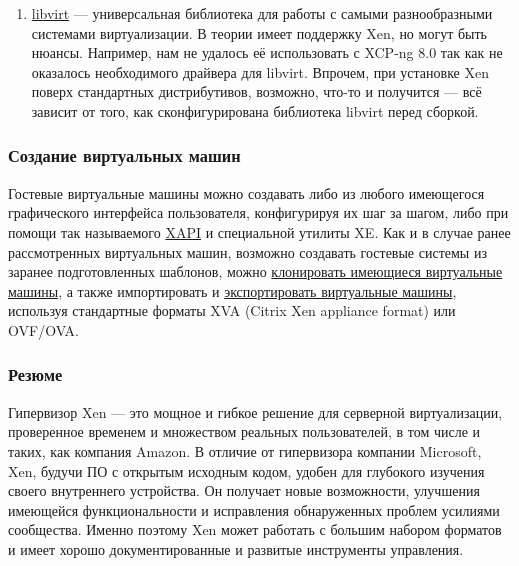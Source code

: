 \documentclass[14pt, a4paper]{article}
\begin{document}
\begin{enumerate}
\begin{figure}[h]
        \label{2.4} %
    \end{figure}
    \item \href{https://libvirt.org/}{libvirt} — универсальная библиотека для работы с самыми разнообразными системами
виртуализации. В теории имеет поддержку Xen, но могут быть нюансы. Например, нам не
удалось её использовать с XCP-ng 8.0 так как не оказалось необходимого драйвера для libvirt.
Впрочем, при установке Xen поверх стандартных дистрибутивов, возможно, что-то и получится
— всё зависит от того, как сконфигурирована библиотека libvirt перед сборкой.\\
\end{enumerate}

\subsubsection*{Создание виртуальных машин}

Гостевые виртуальные машины можно создавать либо из любого имеющегося графического
интерфейса пользователя, конфигурируя их шаг за шагом, либо при помощи так называемого \href{https://wiki.xenproject.org/wiki/XAPI_Command_Line_Interface}{XAPI} и
специальной утилиты XE. Как и в случае ранее рассмотренных виртуальных машин, возможно
создавать гостевые системы из заранее подготовленных шаблонов, можно \href{https://docs.citrix.com/en-us/xencenter/7-1/vms-about.html}{клонировать имеющиеся
виртуальные машины}, а также импортировать и \href{https://docs.citrix.com/en-us/xencenter/7-1/vms-exportimport.html}{экспортировать виртуальные машины}, используя
стандартные форматы XVA (Citrix Xen appliance format) или OVF/OVA.

\subsubsection*{Резюме}

Гипервизор Xen — это мощное и гибкое решение для серверной виртуализации, проверенное
временем и множеством реальных пользователей, в том числе и таких, как компания Amazon. В
отличие от гипервизора компании Microsoft, Xen, будучи ПО с открытым исходным кодом, удобен для
глубокого изучения своего внутреннего устройства. Он получает новые возможности, улучшения
имеющейся функциональности и исправления обнаруженных проблем усилиями сообщества. Именно
поэтому Xen может работать с большим набором форматов и имеет хорошо документированные и
развитые инструменты управления.
\end{document}
